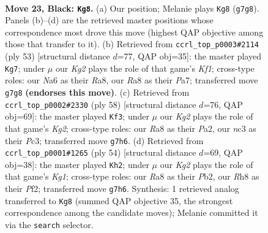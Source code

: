 \documentclass[11pt]{article}
\begin{document}
\clearpage

\begin{figure}[p]\centering
\begin{subfigure}{0.46\textwidth}\centering
\resizebox{\linewidth}{!}{%
\newchessgame
\chessboard[
  setfen={r2q3r/3p1Rkp/n2P4/2pQ4/P5P1/2N5/1P6/R3K3 b Q - 2 23},
  showmover=false,
  pgfstyle=straightmove, color=movearrow, markmove={g7-g8}
]}
\caption{}
\end{subfigure}\hfill
\begin{subfigure}{0.46\textwidth}\centering
\resizebox{\linewidth}{!}{%
\newchessgame
\chessboard[
  setfen={r4kr1/p4q2/3QR3/8/Np5P/8/PP3P2/4K2b b - - 4 27},
  showmover=false,
  pgfstyle=straightmove, color=movearrow, markmove={f8-g7}
]}
\caption{}
\end{subfigure}
\\[4pt]
\begin{subfigure}{0.46\textwidth}\centering
\resizebox{\linewidth}{!}{%
\newchessgame
\chessboard[
  setfen={1r3k1r/5pp1/p7/3PR3/8/2P3Pq/PP1Q1RK1/8 w - - 1 30},
  showmover=false,
  pgfstyle=straightmove, color=movearrow, markmove={g2-f3}
]}
\caption{}
\end{subfigure}\hfill
\begin{subfigure}{0.46\textwidth}\centering
\resizebox{\linewidth}{!}{%
\newchessgame
\chessboard[
  setfen={r5k1/4qpp1/p1RR4/1p6/8/1P5P/1P1Q1PP1/4r1K1 w - - 1 28},
  showmover=false,
  pgfstyle=straightmove, color=movearrow, markmove={g1-h2}
]}
\caption{}
\end{subfigure}
\caption{\textbf{Move 23, Black: \texttt{Kg8}.} (a) Our position; Melanie plays \texttt{Kg8} (\texttt{g7g8}). Panels (b)--(d) are the retrieved master positions whose correspondence most drove this move (highest QAP objective among those that transfer to it). (b) Retrieved from \texttt{ccrl\_top\_p0003\#2114} (ply 53) [structural distance $d$=77, QAP obj=35]: the master played \texttt{Kg7}; under $\mu$ our \emph{Kg2} plays the role of that game's \emph{Kf1}; cross-type roles: our \emph{N}a6 as their \emph{R}a8, our \emph{R}a8 as their \emph{P}a7; transferred move \texttt{g7g8} \textbf{(endorses this move)}. (c) Retrieved from \texttt{ccrl\_top\_p0002\#2330} (ply 58) [structural distance $d$=76, QAP obj=69]: the master played \texttt{Kf3}; under $\mu$ our \emph{Kg2} plays the role of that game's \emph{Kg2}; cross-type roles: our \emph{R}a8 as their \emph{P}a2, our \emph{n}c3 as their \emph{P}c3; transferred move \texttt{g7h6}. (d) Retrieved from \texttt{ccrl\_top\_p0001\#1265} (ply 54) [structural distance $d$=69, QAP obj=38]: the master played \texttt{Kh2}; under $\mu$ our \emph{Kg2} plays the role of that game's \emph{Kg1}; cross-type roles: our \emph{R}a8 as their \emph{P}b2, our \emph{R}h8 as their \emph{P}f2; transferred move \texttt{g7h6}. Synthesis: 1 retrieved analog transferred to \texttt{Kg8} (summed QAP objective 35, the strongest correspondence among the candidate moves); Melanie committed it via the \texttt{search} selector.}
\label{fig:thought-m45}
\end{figure}
\end{document}
